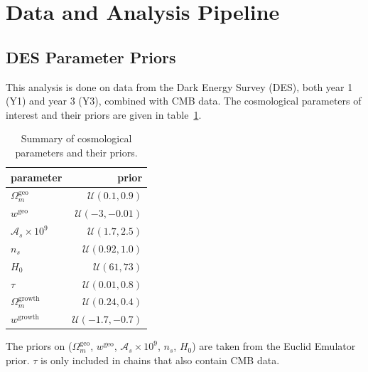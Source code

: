 \section{Data and Analysis Pipeline}
\subsection{DES Parameter Priors}
This analysis is done on data from the Dark Energy Survey (DES), both year 1 (Y1) and year 3 (Y3), combined with CMB data. The cosmological parameters of interest and their priors are given in table~\ref{table:cosmo_prior}.
\begin{table}
\centering
\begin{tabular}{lr}
	\hline
	parameter & prior \\
	\hline\hline
	$\Omega_m^{\text{geo}}$    & $\mathcal{U}(0.1,0.9)$   \\
	$w^{\mathrm{geo}}$         & $\mathcal{U}(-3,-0.01)$  \\
	$\mathcal{A}_s\times10^9$  & $\mathcal{U}(1.7,2.5)$   \\
	$n_s$                      & $\mathcal{U}(0.92,1.0)$  \\
	$H_0$                      & $\mathcal{U}(61,73)$     \\
	$\tau$                     & $\mathcal{U}(0.01,0.8)$  \\
	$\Omega_m^{\text{growth}}$ & $\mathcal{U}(0.24,0.4)$  \\
	$w^{\mathrm{growth}}$      & $\mathcal{U}(-1.7,-0.7)$ \\
	\hline
\end{tabular}
\caption{Summary of cosmological parameters and their priors.}
\label{table:cosmo_prior}
\end{table}
The priors on ($\Omega_m^{\text{geo}}$, $w^{\mathrm{geo}}$, $\mathcal{A}_s\times10^9$, $n_s$, $H_0$) are taken from the Euclid Emulator prior. $\tau$ is only included in chains that also contain CMB data.

